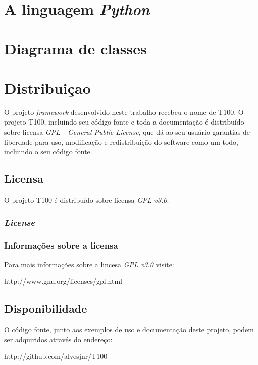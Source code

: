 \chapter{A linguagem \textit{Python} \label{appendix_python}}
\chapter{Diagrama de classes \label{appendix_uml_completo}}
\chapter{Distribuiçao}

O projeto \textit{framework} desenvolvido neste trabalho recebeu o nome de T100. O projeto T100, incluindo seu código fonte e toda a documentação é distribuído sobre licensa \textit{GPL - General Public License}, que dá ao seu usuário garantias de liberdade para uso, modificação e redistribuição do software como um todo, incluindo o seu código fonte.

\section{Licensa}

O projeto T100 é distribuído sobre licensa \textit{GPL v3.0}.

\subsection{\emph{License}}



\subsection{Informações sobre a licensa}

Para mais informações sobre a lincesa \textit{GPL v3.0} visite:

http://www.gnu.org/licenses/gpl.html

\section{Disponibilidade}

O código fonte, junto aos exemplos de uso e documentação deste projeto, podem ser adquiridos através do endereço:

http://github.com/alvesjnr/T100

